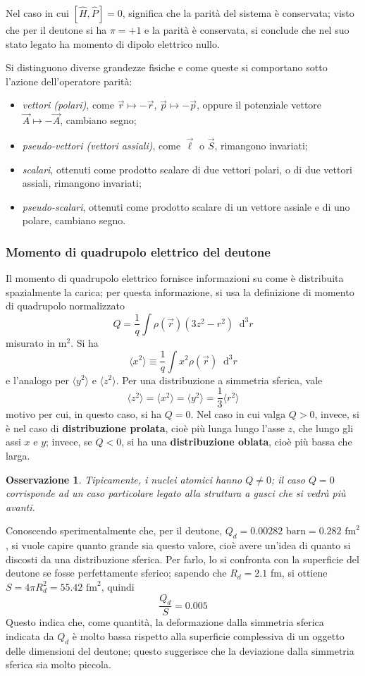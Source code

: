 \documentclass[11pt, a4paper]{scrartcl}
\theoremstyle{style}
\newtheorem{osservazione}{Osservazione}[section]
\newcommand{\dd}{\mathop{}\!\mathrm{d}}
\numberwithin{equation}{subsection}
\begin{document}
Nel caso in cui $[\hat{H}, \hat{P}]=0$, significa che la parit\`a del sistema \`e conservata; visto che per il deutone si ha $\pi=+1$ e la parit\`a \`e conservata, si conclude che nel suo stato legato ha momento di dipolo elettrico nullo.

Si distinguono diverse grandezze fisiche e come queste si comportano sotto l'azione dell'operatore parit\`a:
\begin{itemize}
	\item \textit{vettori (polari)}, come $\vec{r}\mapsto -\vec{r}$, $\vec{p}\mapsto - \vec{p}$, oppure il potenziale vettore $\vec{A}\mapsto - \vec{A}$, cambiano segno;
	\item \textit{pseudo-vettori (vettori assiali)}, come $\vec{\ell }$ o $\vec{S}$, rimangono invariati;
	\item \textit{scalari}, ottenuti come prodotto scalare di due vettori polari, o di due vettori assiali, rimangono invariati;
	\item \textit{pseudo-scalari}, ottenuti come prodotto scalare di un vettore assiale e di uno polare, cambiano segno.
\end{itemize}

\subsubsection{Momento di quadrupolo elettrico del deutone}

Il momento di quadrupolo elettrico fornisce informazioni su come \`e distribuita spazialmente la carica; per questa informazione, si usa la definizione di momento di quadrupolo normalizzato 
\[
Q= \frac{1}{q} \int \rho (\vec{r}) \left(3z^2 - r^2\right) \dd ^3 r
\] 
misurato in $\text{m}^2$.
Si ha
\[
\langle x^2 \rangle \equiv \frac{1}{q}\int x^2\rho (\vec{r})\dd ^3 r
\] 
e l'analogo per $\langle y^2 \rangle$ e $\langle z^2 \rangle$.
Per una distribuzione a simmetria sferica, vale
\[
\langle z^2 \rangle = \langle x^2 \rangle= \langle y^2 \rangle = \frac{1}{3} \langle r^2 \rangle
\] 
motivo per cui, in questo caso, si ha $Q=0$.
Nel caso in cui valga $Q>0$, invece, si \`e nel caso di \textbf{distribuzione prolata}, cio\`e pi\`u lunga lungo l'asse $z$, che lungo gli assi $x$ e $y$; invece, se $Q<0$, si ha una \textbf{distribuzione oblata}, cio\`e pi\`u bassa che larga.
\begin{osservazione}
Tipicamente, i nuclei atomici hanno $Q\neq 0$; il caso $Q =0 $ corrisponde ad un caso particolare legato alla struttura a gusci che si vedr\`a pi\`u avanti.
\end{osservazione}
\noindent Conoscendo sperimentalmente che, per il deutone, $Q_d = 0.00282\text{ barn} = 0.282\text{ fm}^2$, si vuole capire quanto grande sia questo valore, cio\`e avere un'idea di quanto si discosti da una distribuzione sferica.
Per farlo, lo si confronta con la superficie del deutone se fosse perfettamente sferico; sapendo che $R_d = 2.1$ fm, si ottiene $S = 4 \pi R_d^2 = 55.42 \text{ fm}^2$, quindi 
\[
\frac{Q_d}{S} = 0.005
\] 
Questo indica che, come quantit\`a, la deformazione dalla simmetria sferica indicata da $Q_d$ \`e molto bassa rispetto alla superficie complessiva di un oggetto delle dimensioni del deutone; questo suggerisce che la deviazione dalla simmetria sferica sia molto piccola.
\end{document}
